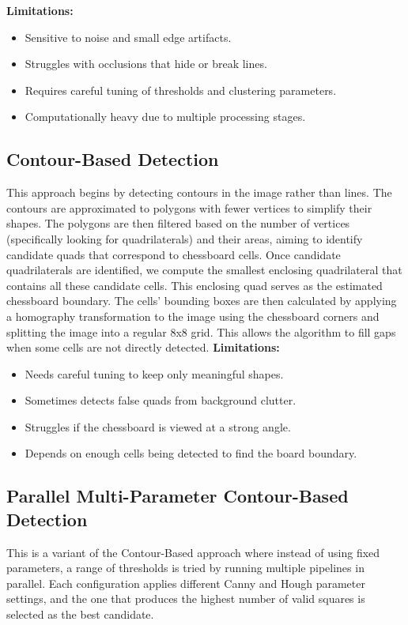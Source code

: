 \noindent
\textbf{Limitations:}
\begin{itemize}
  \item Sensitive to noise and small edge artifacts.
  \item Struggles with occlusions that hide or break lines.
  \item Requires careful tuning of thresholds and clustering parameters.
  \item Computationally heavy due to multiple processing stages.
\end{itemize}

\subsection{Contour-Based Detection}
This approach begins by detecting contours in the image rather than lines. 
The contours are approximated to polygons with fewer vertices to simplify their shapes. 
The polygons are then filtered based on the number of vertices (specifically looking for quadrilaterals) and their areas, 
aiming to identify candidate quads that correspond to chessboard cells. 
\newline
Once candidate quadrilaterals are identified, we compute the smallest enclosing quadrilateral that contains all these candidate cells. 
This enclosing quad serves as the estimated chessboard boundary.
\newline
The cells' bounding boxes are then calculated by applying a homography transformation to the image using the chessboard corners and splitting the image into a regular 8x8 grid. This allows the algorithm to fill gaps when some cells are not directly detected.
\newline
\textbf{Limitations:}
\begin{itemize}
  \item Needs careful tuning to keep only meaningful shapes.
  \item Sometimes detects false quads from background clutter.
  \item Struggles if the chessboard is viewed at a strong angle.
  \item Depends on enough cells being detected to find the board boundary.
\end{itemize}

\subsection{Parallel Multi-Parameter Contour-Based Detection}
This is a variant of the Contour-Based approach where instead of using fixed parameters, a range of thresholds is tried by running multiple pipelines in parallel. 
Each configuration applies different Canny and Hough parameter settings, and the one that produces the highest number of valid squares is selected as the best candidate.

